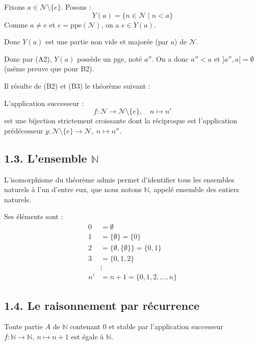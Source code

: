 \documentclass[a4paper,11pt]{article}
\newcommand{\N}{\mathbb{N}}
\begin{document}
\begin{demonstration}
Fixons $a \in \mathcal{N} \setminus \{e\}$. Posons :
\[
Y(a) = \{ n \in \mathcal{N} \mid n < a \}
\]
Comme $a \neq e$ et $e = \text{ppe}(\mathcal{N})$, on a $e \in Y(a)$.

Donc $Y(a)$ est une partie non vide et majorée (par $a$) de $\mathcal{N}$.

Donc par (A2), $Y(a)$ possède un pge, noté $a''$. On a donc $a'' < a$ et $]a'', a[ = \emptyset$ (même preuve que pour B2).
\end{demonstration}

Il résulte de (B2) et (B3) le théorème suivant :

\begin{theoreme}
L'application successeur :
\[
f : \mathcal{N} \longrightarrow \mathcal{N} \setminus \{e\}, \quad n \longmapsto n'
\]
est une bijection strictement croissante dont la réciproque est l'application prédécesseur $g : \mathcal{N} \setminus \{e\} \to \mathcal{N}, \ n \mapsto n''$.
\end{theoreme}

\subsection{1.3. L'ensemble $\N$}

L'isomorphisme du théorème admis permet d'identifier tous les ensembles naturels à l'un d'entre eux, que nous notons $\N$, appelé ensemble des entiers naturels.

Ses éléments sont :
\begin{align*}
    0 &= \emptyset \\
    1 &= \{\emptyset\} = \{0\} \\
    2 &= \{\emptyset, \{\emptyset\}\} = \{0, 1\} \\
    3 &= \{0, 1, 2\} \\
    &\vdots \\
    n' &= n + 1 = \{0, 1, 2, \dots, n\}
\end{align*}

\subsection{1.4. Le raisonnement par récurrence}

\begin{proposition}
Toute partie $A$ de $\N$ contenant $0$ et stable par l'application successeur $f : \N \to \N, \ n \mapsto n + 1$ est égale à $\N$.
\end{proposition}
\end{document}
